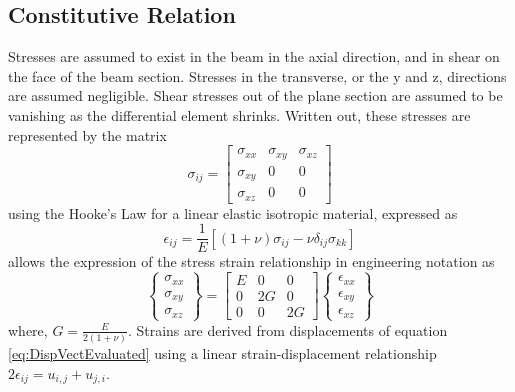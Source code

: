 \subsection{Constitutive Relation}
Stresses are assumed to exist in the beam in the axial direction, and in shear on the face of the beam section. Stresses in the transverse, or the y and z, directions are assumed negligible. Shear stresses out of the plane section are assumed to be vanishing as the differential element shrinks. Written out, these stresses are represented by the matrix
\begin{equation}\label{key}
\sigma_{ij}=\left[\begin{array}{ccc}
\sigma_{xx}&\sigma_{xy}&\sigma_{xz}\\
\sigma_{xy}&0&0\\
\sigma_{xz}&0&0
\end{array}\right]
\end{equation}
using the Hooke's Law for a linear elastic isotropic material, expressed as
\begin{equation}\label{key}
\epsilon_{ij}=\frac{1}{E}[(1+\nu)\sigma_{ij}-\nu\delta_{ij}\sigma_{kk}]
\end{equation}
allows the expression of the stress strain relationship in engineering notation as
\begin{equation}\label{eq:ConstitutiveRelationshipEngineeringNotation}
\left\{\begin{array}{c}
\sigma_{xx}\\ \sigma_{xy}\\ \sigma_{xz}
\end{array}\right\} = \left[\begin{array}{ccc}
E&0&0\\0&2G&0\\0&0&2G
\end{array}\right] \left\{\begin{array}{c}
\epsilon_{xx}\\ \epsilon_{xy}\\ \epsilon_{xz}
\end{array}\right\}
\end{equation}
where, $ G=\frac{E}{2(1+\nu)} $. Strains are derived from displacements of equation \ref{eq:DispVectEvaluated} using a linear strain-displacement relationship $ 2\epsilon_{ij}=u_{i,j}+u_{j,i} $.
%
